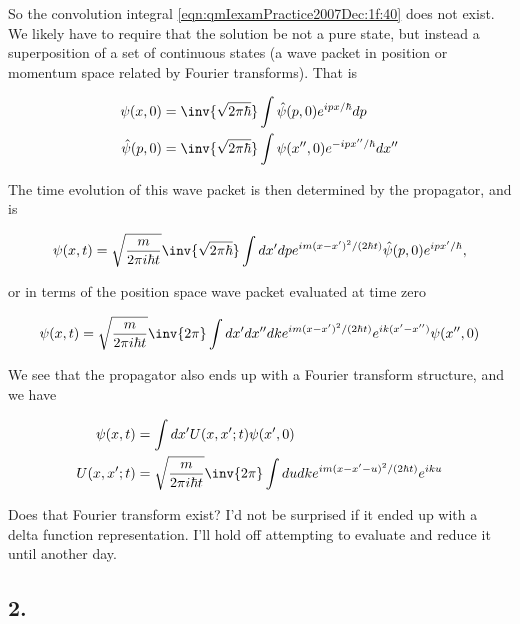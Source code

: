 So the convolution integral \ref{eqn:qmIexamPractice2007Dec:1f:40} does not exist.  We likely have to require that the solution be not a pure state, but instead a superposition of a set of continuous states (a wave packet in position or momentum space related by Fourier transforms).  That is

\begin{align}\label{eqn:qmIexamPractice2007Dec:1f:60}
\psi(x, 0) &= 
\inv{\sqrt{2 \pi \hbar}} \int \hat{\psi}(p, 0) e^{i p x/\hbar} dp \\
\hat{\psi}(p, 0) &= 
\inv{\sqrt{2 \pi \hbar}} \int \psi(x'', 0) e^{-i p x''/\hbar} dx''
\end{align}

The time evolution of this wave packet is then determined by the propagator, and is

\begin{equation}\label{eqn:qmIexamPractice2007Dec:1f:70}
\psi(x,t) =
\sqrt{\frac{m}{2 \pi i \hbar t}} 
\inv{\sqrt{2 \pi \hbar}} 
\int dx' dp
e^{i m (x-x')^2/ (2 \hbar t)}
\hat{\psi}(p, 0) e^{i p x'/\hbar} ,
\end{equation}

or in terms of the position space wave packet evaluated at time zero

\begin{equation}\label{eqn:qmIexamPractice2007Dec:1f:80}
\psi(x,t) =
\sqrt{\frac{m}{2 \pi i \hbar t}}
\inv{2 \pi}
\int dx' dx'' dk
e^{i m (x-x')^2/ (2 \hbar t)}
e^{i k (x' - x'')} \psi(x'', 0)
\end{equation}

We see that the propagator also ends up with a Fourier transform structure, and we have

\begin{align}\label{eqn:qmIexamPractice2007Dec:1f:90}
\psi(x,t) &= \int dx' U(x, x' ; t) \psi(x', 0) \\
U(x, x' ; t) &=
\sqrt{\frac{m}{2 \pi i \hbar t}}
\inv{2 \pi}
\int du dk
e^{i m (x - x' - u)^2/ (2 \hbar t)}
e^{i k u }
\end{align}

Does that Fourier transform exist?  I'd not be surprised if it ended up with a delta function representation.  I'll hold off attempting to evaluate and reduce it until another day.

\subsection{2.}


